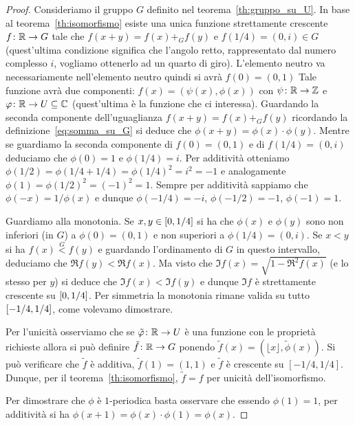 \begin{proof}
  Consideriamo il gruppo $G$ definito nel teorema~\ref{th:gruppo_su_U}.
  In base al teorema~\ref{th:isomorfismo} esiste una unica funzione strettamente crescente 
  $f\colon {\mathbb R} \to G$ tale che $f(x+y) = f(x)+_G f(y)$ e 
  $f(1/4)=(0,i)\in G$
  (quest'ultima condizione significa che l'angolo retto, rappresentato dal 
  numero complesso $i$, vogliamo ottenerlo ad un quarto di giro). 
  L'elemento neutro va necessariamente nell'elemento neutro quindi
  si avrà $f(0)=(0,1)$
  Tale funzione avrà due componenti: $f(x) = (\psi(x),\phi(x))$
  con $\psi\colon {\mathbb R}\to{\mathbb Z}$ e $\varphi\colon {\mathbb R}\to U\subseteq {\mathbb C}$ 
  (quest'ultima è la funzione che ci interessa).
  Guardando la seconda componente dell'uguaglianza $f(x+y) = f(x)+_G f(y)$ 
  ricordando la definizione~\eqref{eq:somma_su_G}
  si deduce che $\phi(x+y) = \phi(x)\cdot \phi(y)$. 
  Mentre se guardiamo la seconda componente di $f(0)=(0,1)$ 
  e di $f(1/4) = (0,i)$ deduciamo che $\phi(0) = 1$ e $\phi(1/4) = i$.
  Per additività otteniamo 
  $\phi(1/2)=\phi(1/4+1/4)= \phi(1/4)^2 = i^2=-1$ 
  e analogamente $\phi(1) = \phi(1/2)^2 = (-1)^2 = 1$.
  Sempre per additività sappiamo che $\phi(-x) = 1/\phi(x)$ 
  e dunque $\phi(-1/4)=-i$, $\phi(-1/2)=-1$, $\phi(-1)=1$.
  
  Guardiamo alla monotonia. 
  Se $x,y\in \left[0,1/4\right]$ 
  si ha che $\phi(x)$ e $\phi(y)$ sono non inferiori (in $G$)
  a $\phi(0)=(0,1)$ e non superiori a $\phi(1/4)=(0,i)$.
  Se $x<y$ si ha $f(x) \stackrel G< f(y)$ e 
  guardando l'ordinamento di $G$ in questo intervallo, deduciamo
  che $\Re f(y) < \Re f(x)$. 
  Ma visto che $\Im f(x) = \sqrt{1-\Re^2 f(x)}$ (e lo stesso per $y$)
  si deduce che $\Im f(x) < \Im f(y)$ e dunque $\Im f$ è
  strettamente crescente su $\left[0,1/4\right]$.
  Per simmetria la monotonia rimane valida su 
  tutto $\left[-1/4,1/4\right]$, come volevamo dimostrare.
  
  Per l'unicità osserviamo che se $\tilde{\varphi}\colon{\mathbb R}\to U$ è una funzione 
  con le proprietà richieste allora si può definire 
  $\tilde f\colon {\mathbb R} \to G$ ponendo $\tilde f(x) = (\lfloor x\rfloor, \tilde \phi(x))$.
  Si può verificare che $\tilde f$ è additiva, $\tilde f(1)=(1, 1)$ 
  e $\tilde f$ è crescente su $[-1/4,1/4]$. 
  Dunque, per il teorema~\ref{th:isomorfismo}, $\tilde f = f$ 
  per unicità dell'isomorfismo.

  Per dimostrare che $\phi$ è $1$-periodica 
  basta osservare che essendo $\phi(1)=1$, 
  per additività si ha $\phi(x+1) = \phi(x)\cdot \phi(1) = \phi(x)$.
\end{proof}

